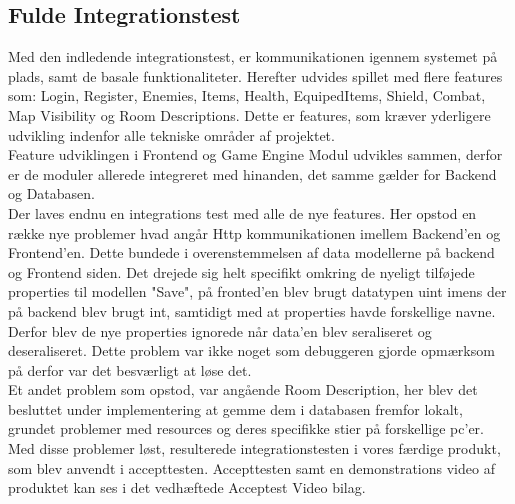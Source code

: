 \subsection{Fulde Integrationstest}

Med den indledende integrationstest, er kommunikationen igennem systemet på plads, samt de basale funktionaliteter. Herefter udvides spillet med flere features som: Login, Register, Enemies, Items, Health, EquipedItems, Shield, Combat, Map Visibility og Room Descriptions. Dette er features, som kræver yderligere udvikling indenfor alle tekniske områder af projektet.\\

\noindent Feature udviklingen i Frontend og Game Engine Modul udvikles sammen, derfor er de moduler allerede integreret med hinanden, det samme gælder for Backend og Databasen.\\

\noindent Der laves endnu en integrations test med alle de nye features. Her opstod en række nye problemer hvad angår Http kommunikationen imellem Backend'en og Frontend'en. Dette bundede i overenstemmelsen af data modellerne på backend og Frontend siden. Det drejede sig helt specifikt omkring de nyeligt tilføjede properties til modellen "Save", på fronted'en blev brugt datatypen uint imens der på backend blev brugt int, samtidigt med at properties havde forskellige navne. Derfor blev de nye properties ignorede når data'en blev seraliseret og deseraliseret. Dette problem var ikke noget som debuggeren gjorde opmærksom på derfor var det besværligt at løse det.\\

\noindent Et andet problem som opstod, var angående Room Description, her blev det besluttet under implementering at gemme dem i databasen fremfor lokalt, grundet problemer med resources og deres specifikke stier på forskellige pc'er.\\

\noindent Med disse problemer løst, resulterede integrationstesten i vores færdige produkt, som blev anvendt i accepttesten. Accepttesten samt en demonstrations video af produktet kan ses i det vedhæftede Acceptest Video bilag.   
 

  


